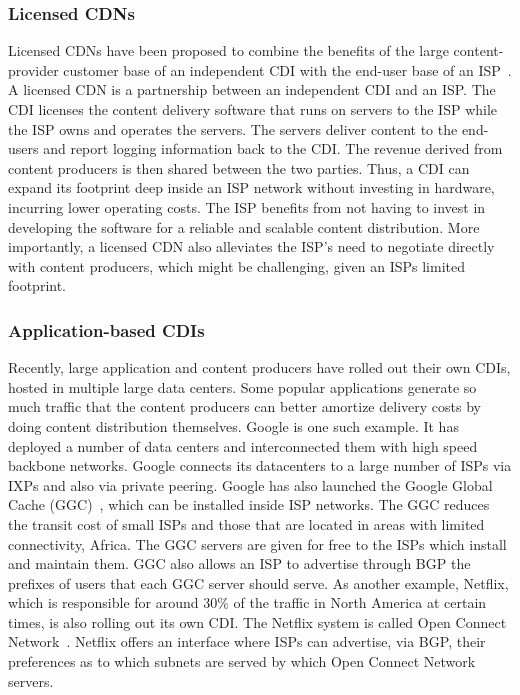 \subsubsection{Licensed CDNs} Licensed CDNs have been proposed to combine the
benefits of the large content-provider customer base of an independent CDI with
the end-user base of an ISP~\cite{LicensedCDN}.  A licensed CDN is a
partnership between an independent CDI and an ISP. The CDI licenses the content
delivery software that runs on servers to the ISP while the ISP owns and
operates the servers. The servers deliver content to the end-users and report
logging information back to the CDI.  The revenue derived from content
producers is then shared between the two parties. Thus, a CDI can expand its
footprint deep inside an ISP network without investing in hardware, incurring
lower operating costs.  The ISP benefits from not having to invest in
developing the software for a reliable and scalable content distribution. More
importantly, a licensed CDN also alleviates the ISP's need to negotiate
directly with content producers, which might be challenging, given an ISPs
limited footprint.

\subsubsection{Application-based CDIs} Recently, large application and content
producers have rolled out their own CDIs, hosted in multiple large data
centers. Some popular applications generate so much traffic that the content
producers can better amortize delivery costs by doing content distribution
themselves.  Google is one such example.  It has deployed a number of data
centers and interconnected them with high speed backbone networks.  Google
connects its datacenters to a large number of ISPs via IXPs and also via
private peering.  Google has also launched the Google Global Cache
(GGC)~\cite{GoogleCache}, which can be installed inside ISP networks.  The GGC
reduces the transit cost of small ISPs and those that are located in areas with
limited connectivity, \eg Africa. The GGC servers are given for free to the
ISPs which install and maintain them.  GGC also allows an ISP to advertise
through BGP the prefixes of users that each GGC server should serve.  As
another example, Netflix, which is responsible for around 30\% of the traffic
in North America at certain times, is also rolling out its own CDI. The Netflix
system is called Open Connect Network~\cite{NetflixCDN}. Netflix offers an
interface where ISPs can advertise, via BGP, their preferences as to which
subnets are served by which Open Connect Network servers.

